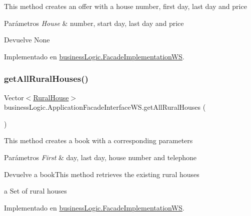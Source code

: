 This method creates an offer with a house number, first day, last day and price


\begin{DoxyParams}{Parámetros}
{\em House} & number, start day, last day and price \\
\hline
\end{DoxyParams}
\begin{DoxyReturn}{Devuelve}
None 
\end{DoxyReturn}


Implementado en \mbox{\hyperlink{classbusiness_logic_1_1_facade_implementation_w_s_ac7b3bdfd0815ea7c787da312de594cce}{business\+Logic.\+Facade\+Implementation\+WS}}.

\mbox{\label{interfacebusiness_logic_1_1_application_facade_interface_w_s_a553cbfb37ea9f1621ba76ad8308a15da}} 
\subsubsection{\texorpdfstring{getAllRuralHouses()}{getAllRuralHouses()}}
{\footnotesize\ttfamily Vector$<$\mbox{\hyperlink{classdomain_1_1_rural_house}{Rural\+House}}$>$ business\+Logic.\+Application\+Facade\+Interface\+W\+S.\+get\+All\+Rural\+Houses (\begin{DoxyParamCaption}{ }\end{DoxyParamCaption})}

This method creates a book with a corresponding parameters


\begin{DoxyParams}{Parámetros}
{\em First} & day, last day, house number and telephone \\
\hline
\end{DoxyParams}
\begin{DoxyReturn}{Devuelve}
a book\+This method retrieves the existing rural houses

a Set of rural houses 
\end{DoxyReturn}


Implementado en \mbox{\hyperlink{classbusiness_logic_1_1_facade_implementation_w_s_aa6f21ddb40ca6cd752a13e31ff016e7e}{business\+Logic.\+Facade\+Implementation\+WS}}.

